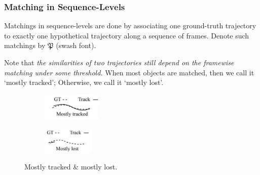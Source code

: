 \documentclass[slidestop, mathserif]{beamer}
\begin{document}
\begin{frame}
    \frametitle{Matching in Sequence-Levels}
    
    Matchings in sequence-levels are done by associating one ground-truth trajectory
    to exactly one hypothetical trajectory
    along a sequence of frames.
    Denote such matchings by $\mathfrak P$ (swash font).
    
    \quad

    Note that \emph{the similarities of two trajectories still depend on the
    framewise matching under some threshold.}
    When most objects are matched, then we call it `mostly tracked';
    Otherwise, we call it `mostly lost'.
    \begin{figure}
        \begin{subfigure}{.5\textwidth}
            \centering
            \includegraphics[width=80pt]{pics/fig4.png}
        \end{subfigure}%
        \begin{subfigure}{.5\textwidth}
            \centering
            \includegraphics[width=70pt]{pics/fig5.png}
        \end{subfigure}
        \caption{Mostly tracked \& mostly lost.}
    \end{figure}

\end{frame}
\end{document}
